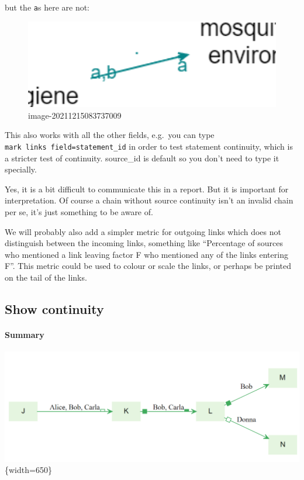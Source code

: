 \documentclass[
]{book}
\begin{document}
but the \texttt{a}s here are not:

\begin{figure}
\centering
\includegraphics[width=6.77083in,height=\textheight]{_assets/image-20211215083737009.png}
\caption{image-20211215083737009}
\end{figure}

This also works with all the other fields, e.g.~you can type \texttt{mark\ links\ field=statement\_id} in order to test statement continuity, which is a stricter test of continuity. source\_id is default so you don't need to type it specially.

Yes, it is a bit difficult to communicate this in a report. But it is important for interpretation. Of course a chain without source continuity isn't an invalid chain per se, it's just something to be aware of.

We will probably also add a simpler metric for outgoing links which does not distinguish between the incoming links, something like ``Percentage of sources who mentioned a link leaving factor F who mentioned any of the links entering F''. This metric could be used to colour or scale the links, or perhaps be printed on the tail of the links.

\hypertarget{show-continuity}{%
\subsection{Show continuity}\label{show-continuity}}

\hypertarget{summary-11}{%
\paragraph{Summary}\label{summary-11}}

\includegraphics[width=6.77083in,height=\textheight]{_assets/image-20211222121147473.png}\{width=650\}
\end{document}
